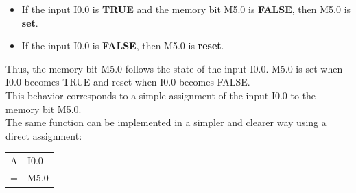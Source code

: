 \begin{solutionblock}

\begin{itemize}
\item If the input I0.0 is \textbf{TRUE} and the memory bit M5.0 is
\textbf{FALSE}, then M5.0 is \textbf{set}.
\item If the input I0.0 is \textbf{FALSE}, then M5.0 is
\textbf{reset}.
\end{itemize}

Thus, the memory bit M5.0 follows the state of the input I0.0.  
M5.0 is set when I0.0 becomes TRUE and reset when I0.0 becomes FALSE.\\

This behavior corresponds to a simple assignment of the input I0.0 to
the memory bit M5.0.\\

The same function can be implemented in a simpler and clearer way using
a direct assignment:\\

\begin{center}
\begin{tabular}{>{\centering\arraybackslash}p{1.5cm}
                >{\centering\arraybackslash}p{1.5cm}}

\hline
A  & I0.0 \\ 
= & M5.0\\
\hline
\end{tabular}
\end{center}
\end{solutionblock}
